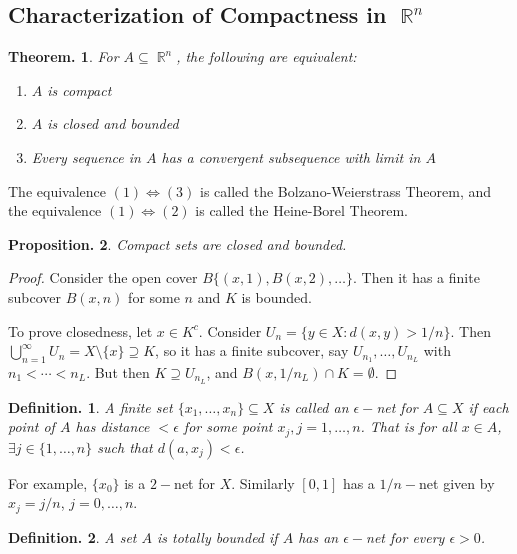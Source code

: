 \documentclass[11pt, a4paper]{memoir}
\DeclareMathOperator{\R}{{\mathbb{R}}}
\theoremstyle{change}
\newtheorem{theorem}{Theorem.}[section]
\newtheorem{proposition}[theorem]{Proposition.}
\theoremstyle{plain}
\theoremstyle{nonumberplain}
\newtheorem{definition}{Definition.}
\newtheorem{proof}{Proof}
\numberwithin{equation}{section}
\begin{document}
\subsection{Characterization of Compactness in $\R^n$}
\begin{theorem}
    For $A\subseteq\R^n$, the following are equivalent:
    \begin{enumerate}
        \item $A$ is compact
        \item $A$ is closed and bounded
        \item Every sequence in $A$ has a convergent subsequence with limit in $A$
    \end{enumerate}
\end{theorem}
The equivalence $(1)\Leftrightarrow(3)$ is called the Bolzano-Weierstrass Theorem, and the equivalence $(1)\Leftrightarrow(2)$
is called the Heine-Borel Theorem.
\begin{proposition}
    Compact sets are closed and bounded.
\end{proposition}
\begin{proof}
    Consider the open cover $B\{(x,1),B(x,2),\ldots\}$. Then it has a finite subcover $B(x,n)$ for some $n$ and $K$ is
    bounded.

    To prove closedness, let $x\in K^c$. Consider $U_n=\{y\in X:d(x,y)>1/n\}$. Then $\bigcup_{n=1}^\infty U_n=X\setminus\{x\}\supseteq K$,
    so it has a finite subcover, say $U_{n_1},\ldots,U_{n_L}$ with $n_1<\cdots<n_L$. But then $K\supseteq U_{n_L}$, and
    $B(x,1/n_L)\cap K=\emptyset$.
\end{proof}
\begin{definition}
    A finite set $\{x_1,\ldots,x_n\}\subseteq X$ is called an \textit{$\epsilon-$net for $A\subseteq X$} if each point of
    $A$ has distance $<\epsilon$ for some point $x_j,j=1,\ldots,n$. That is for all $x\in A$, $\exists j\in\{1,\ldots,n\}$
    such that $d(a,x_j)<\epsilon$.
\end{definition}
For example, $\{x_0\}$ is a $2-$net for $X$. Similarly $[0,1]$ has a $1/n-$net given by $x_j=j/n$, $j=0,\ldots,n$.
\begin{definition}
    A set $A$ is totally bounded if $A$ has an $\epsilon-$net for every $\epsilon>0$.
\end{definition}
\end{document}
